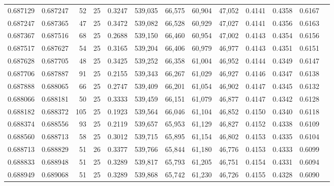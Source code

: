 \begin{tabular}{rrrrrrrrrrrrr}
0.687129 & 0.687247 &    52 &  25 &                                     0.3247 & 539,035 &  66,575 &  60,904 &  47,052 & 0.4141 & 0.4358 & 0.6167 \\
0.687247 & 0.687365 &    47 &  25 &                                     0.3472 & 539,082 &  66,528 &  60,929 &  47,027 & 0.4141 & 0.4356 & 0.6163 \\
0.687367 & 0.687516 &    68 &  25 &                                     0.2688 & 539,150 &  66,460 &  60,954 &  47,002 & 0.4143 & 0.4354 & 0.6156 \\
0.687517 & 0.687627 &    54 &  25 &                                     0.3165 & 539,204 &  66,406 &  60,979 &  46,977 & 0.4143 & 0.4351 & 0.6151 \\
0.687628 & 0.687705 &    48 &  25 &                                     0.3425 & 539,252 &  66,358 &  61,004 &  46,952 & 0.4144 & 0.4349 & 0.6147 \\
0.687706 & 0.687887 &    91 &  25 &                                     0.2155 & 539,343 &  66,267 &  61,029 &  46,927 & 0.4146 & 0.4347 & 0.6138 \\
0.687888 & 0.688065 &    66 &  25 &                                     0.2747 & 539,409 &  66,201 &  61,054 &  46,902 & 0.4147 & 0.4345 & 0.6132 \\
0.688066 & 0.688181 &    50 &  25 &                                     0.3333 & 539,459 &  66,151 &  61,079 &  46,877 & 0.4147 & 0.4342 & 0.6128 \\
0.688182 & 0.688372 &   105 &  25 &                                     0.1923 & 539,564 &  66,046 &  61,104 &  46,852 & 0.4150 & 0.4340 & 0.6118 \\
0.688374 & 0.688556 &    93 &  25 &                                     0.2119 & 539,657 &  65,953 &  61,129 &  46,827 & 0.4152 & 0.4338 & 0.6109 \\
0.688560 & 0.688713 &    58 &  25 &                                     0.3012 & 539,715 &  65,895 &  61,154 &  46,802 & 0.4153 & 0.4335 & 0.6104 \\
0.688713 & 0.688829 &    51 &  26 &                                     0.3377 & 539,766 &  65,844 &  61,180 &  46,776 & 0.4153 & 0.4333 & 0.6099 \\
0.688833 & 0.688948 &    51 &  25 &                                     0.3289 & 539,817 &  65,793 &  61,205 &  46,751 & 0.4154 & 0.4331 & 0.6094 \\
0.688949 & 0.689068 &    51 &  25 &                                     0.3289 & 539,868 &  65,742 &  61,230 &  46,726 & 0.4155 & 0.4328 & 0.6090 \\

\end{tabular}
